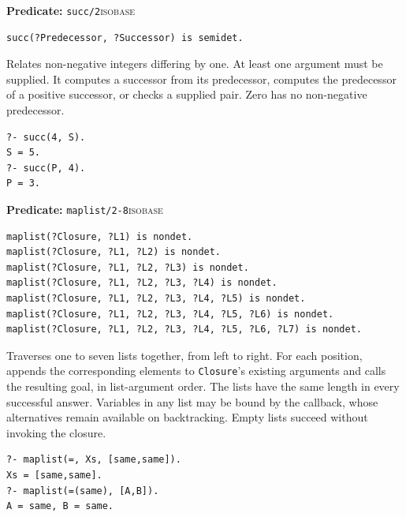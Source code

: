 \par{}
\noindent \textbf{Predicate:} \texttt{succ/2}\hfill\textsc{isobase}
\begin{verbatim}
succ(?Predecessor, ?Successor) is semidet.
\end{verbatim}
\noindent Relates non-negative integers differing by one. At least one argument
must be supplied. It computes a successor from its predecessor, computes the
predecessor of a positive successor, or checks a supplied pair. Zero has no
non-negative predecessor.
\begin{verbatim}
?- succ(4, S).
S = 5.
?- succ(P, 4).
P = 3.
\end{verbatim}

\par{}
\noindent \textbf{Predicate:} \texttt{maplist/2-8}\hfill\textsc{isobase}
\begin{verbatim}
maplist(?Closure, ?L1) is nondet.
maplist(?Closure, ?L1, ?L2) is nondet.
maplist(?Closure, ?L1, ?L2, ?L3) is nondet.
maplist(?Closure, ?L1, ?L2, ?L3, ?L4) is nondet.
maplist(?Closure, ?L1, ?L2, ?L3, ?L4, ?L5) is nondet.
maplist(?Closure, ?L1, ?L2, ?L3, ?L4, ?L5, ?L6) is nondet.
maplist(?Closure, ?L1, ?L2, ?L3, ?L4, ?L5, ?L6, ?L7) is nondet.
\end{verbatim}
\noindent Traverses one to seven lists together, from left to right. For each
position, appends the corresponding elements to \texttt{Closure}'s existing
arguments and calls the resulting goal, in list-argument order. The lists have
the same length in every successful answer. Variables in any list may be bound
by the callback, whose alternatives remain available on backtracking. Empty
lists succeed without invoking the closure.
\begin{verbatim}
?- maplist(=, Xs, [same,same]).
Xs = [same,same].
?- maplist(=(same), [A,B]).
A = same, B = same.
\end{verbatim}

